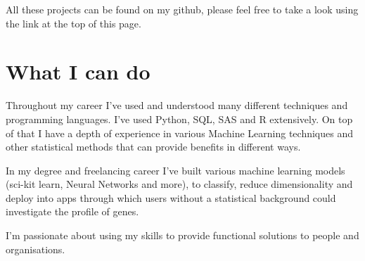 \documentclass[11pt, a4paper]{awesome-cv}
\begin{document}
All these projects can be found on my github, please feel free to take a
look using the link at the top of this page.

\hypertarget{what-i-can-do}{%
\section{What I can do}\label{what-i-can-do}}

Throughout my career I've used and understood many different techniques
and programming languages. I've used Python, SQL, SAS and R extensively.
On top of that I have a depth of experience in various Machine Learning
techniques and other statistical methods that can provide benefits in
different ways.

In my degree and freelancing career I've built various machine learning
models (sci-kit learn, Neural Networks and more), to classify, reduce
dimensionality and deploy into apps through which users without a
statistical background could investigate the profile of genes.

I'm passionate about using my skills to provide functional solutions to
people and organisations.
\end{document}
